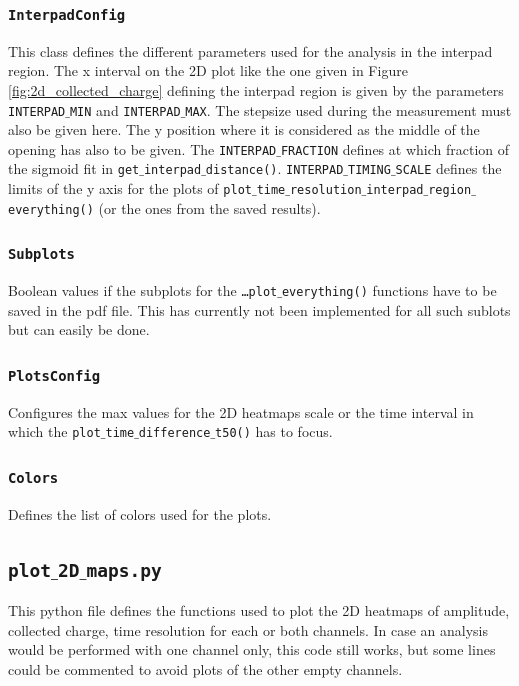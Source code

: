 \subsubsection{\texttt{InterpadConfig}}
This class defines the different parameters used for the analysis in the interpad region. The x interval on the 2D plot like the one given in Figure \ref{fig:2d_collected_charge} defining the interpad region is given by the parameters \texttt{INTERPAD$\_$MIN} and \texttt{INTERPAD$\_$MAX}. The stepsize used during the measurement must also be given here. The y position where it is considered as the middle of the opening has also to be given. The \texttt{INTERPAD$\_$FRACTION} defines at which fraction of the sigmoid fit in \texttt{get$\_$interpad$\_$distance()}. \texttt{INTERPAD$\_$TIMING$\_$SCALE} defines the limits of the y axis for the plots of \texttt{plot$\_$time$\_$resolution$\_$interpad$\_$region$\_$everything()} (or the ones from the saved results).

\subsubsection{\texttt{Subplots}}
Boolean values if the subplots for the \texttt{\dots plot$\_$everything()} functions have to be saved in the pdf file. This has currently not been implemented for all such sublots but can easily be done.

\subsubsection{\texttt{PlotsConfig}}
Configures the max values for the 2D heatmaps scale or the time interval in which the \texttt{plot$\_$time$\_$difference$\_$t50()} has to focus.

\subsubsection{\texttt{Colors}}
Defines the list of colors used for the plots.

\subsection{\texttt{plot$\_$2D$\_$maps.py}}
This python file defines the functions used to plot the 2D heatmaps of amplitude, collected charge, time resolution for each or both channels. In case an analysis would be performed with one channel only, this code still works, but some lines could be commented to avoid plots of the other empty channels.

